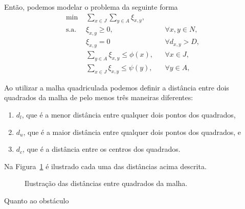Então, podemos modelar o problema da seguinte forma
\begin{subequations}
    \begin{align}
        \text{min } & \sum_{x \in J} \sum_{y \in A} \xi_{x,y},
        \label{eq:model_without_obs:obj_func} \\
        \text{s.a. } & \xi_{x,y} \geq 0, && \forall x, y \in N,
        \label{eq:model_without_obs:var} \\
        & \xi_{x,y} = 0 && \forall d_{x,y} > D,
        \label{eq:model_without_obs:max_dist} \\
        & \sum_{y \in A} \xi_{x,y} \leq \phi(x), && \forall x \in J,
        \label{eq:model_without_obs:max_jazida} \\
        & \sum_{x \in J} \xi_{x,y} \leq \psi(y), && \forall y \in A,
        \label{eq:model_without_obs:max_aterro}
    \end{align}
    \label{eq:model_without_obs}
\end{subequations}

Ao utilizar a malha quadriculada podemos definir a dist\^{a}ncia entre dois quadrados da malha de pelo menos tr\^{e}s maneiras diferentes:
\begin{enumerate}
    \item $d_l$, que \'{e} a menor dist\^{a}ncia entre qualquer dois pontos dos quadrados,
    \item $d_u$, que \'{e} a maior dist\^{a}ncia entre qualquer dois pontos dos quadrados, e
    \item $d_c$, que \'{e} a dist\^{a}ncia entre os centros dos quadrados.
\end{enumerate}
Na Figura~\ref{fig:dist_malha} \'{e} ilustrado cada uma das dist\^{a}ncias acima descrita.
\begin{figure}[!htb]
    \centering
    \caption{Ilustra\c{c}\~{a}o das dist\^{a}ncias entre quadrados da malha.}
    \label{fig:dist_malha}
\end{figure}

Quanto ao obst\'{a}culo
